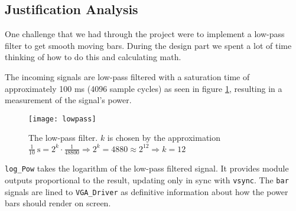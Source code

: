 \subsection{Justification Analysis}

One challenge that we had through the project were to implement a low-pass filter to get smooth moving bars. During the design part we spent a lot of time thinking of how to do this and calculating math.

The incoming signals are low-pass filtered with a saturation time of approximately 100 ms (4096 sample cycles) as seen in figure \ref{fig:lowpass}, resulting in a measurement of the signal's power. 

\begin{figure}[h]
\centering
\texttt{[image: lowpass]}
\caption{The low-pass filter. $k$ is chosen by the approximation $\frac{1}{10}\mathrm{\ s} = 2^k\cdot\frac{1}{48800}\Rightarrow 2^k=4880\approx 2^{12}\Rightarrow k = 12 $}
\label{fig:lowpass}
\end{figure}


\verb=log_Pow= takes the logarithm of the low-pass filtered signal. It provides module outputs proportional to the result, updating only in sync with \verb+vsync+. The \verb+bar+ signals are lined to \verb+VGA_Driver+ as definitive information about how the power bars should render on screen.

